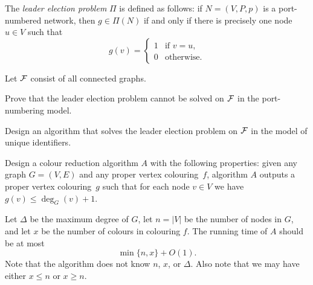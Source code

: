 \begin{ex}
    The \emph{leader election problem} $\Pi$ is defined as follows: if $N = (V,P,p)$ is a port-numbered network, then $g \in \Pi(N)$ if and only if there is precisely one node $u \in V$ such that
    \[
        g(v) = \begin{cases}
            1 & \text{if $v = u$}, \\
            0 & \text{otherwise}.
        \end{cases}
    \]
    
    Let $\mathcal{F}$ consist of all connected graphs.
    \begin{subex}
        \item Prove that the leader election problem cannot be solved on $\mathcal{F}$ in the port-numbering model.
        \item Design an algorithm that solves the leader election problem on $\mathcal{F}$ in the model of unique identifiers.
    \end{subex}
\end{ex}

\begin{ex}\label{ex:greedy-iterate}
    Design a colour reduction algorithm $A$ with the following properties:
    given any graph $G = (V,E)$ and any proper vertex colouring~$f$,
    algorithm $A$ outputs a proper vertex colouring~$g$ such that
    for each node $v \in V$ we have $g(v) \le \deg_G(v) + 1$.
    
    Let $\Delta$ be the maximum degree of $G$, let $n = |V|$ be the number of nodes in $G$, and let $x$ be the number of colours in colouring $f$. The running time of $A$ should be at most
    \[
        \min \{ n, x \} + O(1).
    \]
    Note that the algorithm does not know $n$, $x$, or $\Delta$. Also note that we may have either $x \le n$ or $x \ge n$.
    
\end{ex}

